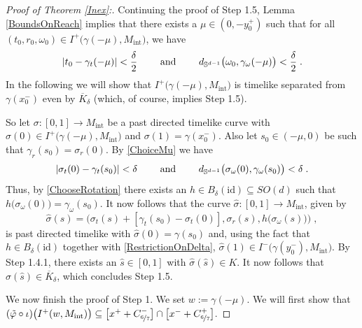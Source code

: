 \documentclass[reqno]{article}
\newcommand{\Sd}{\mathbb{S}^{d-1}}
\newcommand{\Mint}{M_{\mathrm{int}}}
\begin{document}
\begin{proof}[Proof of Theorem \ref{Inex}:]
Continuing the proof of Step 1.5, Lemma \ref{BoundsOnReach} implies that there exists a $\mu \in (0, -y^+_0)$ such that for all $(t_0,r_0, \omega_0) \in I^+\big(\gamma(-\mu),\Mint\big)$, we have
\begin{equation}
\label{ChoiceMu}
|t_0 - \gamma_t(-\mu)| < \frac{\delta}{2} \qquad \textnormal{ and } \qquad d_{\Sd}\big(\omega_0, \gamma_\omega(-\mu)\big) < \frac{\delta}{2} \;.
\end{equation}
In the following we will show that $I^+\big(\gamma(-\mu),\Mint\big)$ is timelike separated from $\gamma(x^-_0)$ even by $\overline{K}_\delta$ (which, of course, implies Step 1.5).

So let $\sigma : [0,1] \to \Mint$ be a past directed timelike curve with $\sigma(0) \in I^+\big(\gamma(-\mu),\Mint\big)$ and $\sigma (1) = \gamma(x^-_0)$. Also let $s_0 \in (-\mu ,0)$ be such that $\gamma_r(s_0) = \sigma_r (0)$.
 By \eqref{ChoiceMu} we have 
 \begin{equation*}
 |\sigma_t(0) - \gamma_t(s_0)| < \delta \qquad \textnormal{ and } \qquad d_{\Sd}\big(\sigma_\omega(0), \gamma_\omega(s_0)\big) < \delta \;.
 \end{equation*}
Thus, by \eqref{ChooseRotation} there exists an $h \in B_\delta(\mathrm{id}) \subseteq SO(d)$ such that $h\big(\sigma_\omega(0)\big) = \gamma_\omega(s_0)$. It now follows that the curve $\hat{\sigma} : [0,1] \to \Mint$, given by 
\begin{equation*}
\hat{\sigma}(s) = \Big(\sigma_t(s) + [\gamma_t(s_0) - \sigma_t(0)], \sigma_r(s), h\big(\sigma_\omega(s)\big)\Big)\;,
\end{equation*}
is past directed timelike with $\hat{\sigma}(0) = \gamma(s_0)$ and, using the fact that $h \in B_\delta(\mathrm{id})$ together with \eqref{RestrictionOnDelta},  $\hat{\sigma}(1) \in I^-\big(\gamma(y^-_0),\Mint\big)$. By Step 1.4.1, there exists an $\hat{s} \in [0,1]$ with $\hat{\sigma}(\hat{s}) \in K$. It now follows that $\sigma(\hat{s}) \in \overline{K}_\delta$, which concludes Step 1.5.
\vspace*{2mm}

We now finish the proof of Step 1. We set $w := \gamma(-\mu)$. We will first show that $(\tilde{\varphi} \circ \iota) \big(I^+(w, \Mint)\big) \subseteq  \big[x^+ + C^-_{\nicefrac{6}{7}}\big] \cap \big[x^- + C^+_{\nicefrac{6}{7}}\big]$.  


\end{proof}
\end{document}
